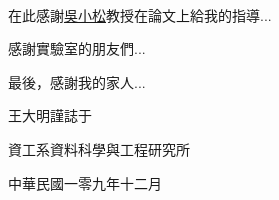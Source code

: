 
\newpage
\begin{center}
  \LARGE
   \\[0.5cm]
\end{center}

\normalsize 
在此感謝\underline{吳小松}教授在論文上給我的指導...

\vspace{5mm}

感謝實驗室的朋友們...

\vspace{5mm}

最後，感謝我的家人...

\begin{flushright}
王大明\hspace{5mm}謹誌于

資工系資料科學與工程研究所

中華民國一零九年十二月
\end{flushright}
